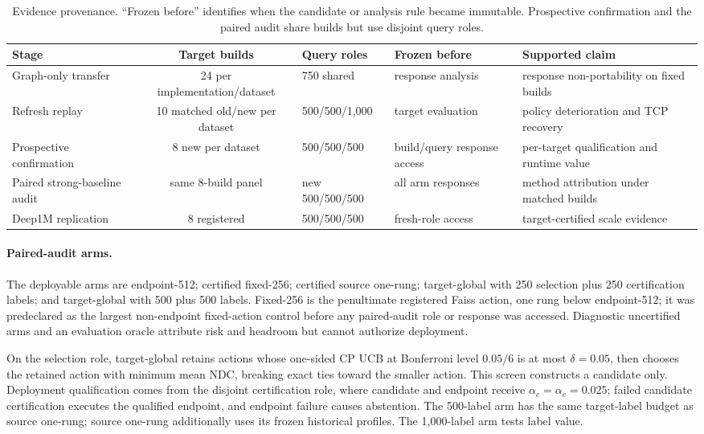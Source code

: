 \begin{table}[t]
\caption{Evidence provenance. ``Frozen before'' identifies when the candidate or analysis rule became immutable. Prospective confirmation and the paired audit share builds but use disjoint query roles.}
\label{tab:provenance}
\scriptsize
\begin{tabularx}{\textwidth}{@{}lcllX@{}}\toprule
Stage & Target builds & Query roles & Frozen before & Supported claim \\\midrule
Graph-only transfer & 24 per implementation/dataset & 750 shared & response analysis & response non-portability on fixed builds \\
Refresh replay & 10 matched old/new per dataset & 500/500/1,000 & target evaluation & policy deterioration and TCP recovery \\
Prospective confirmation & 8 new per dataset & 500/500/500 & build/query response access & per-target qualification and runtime value \\
Paired strong-baseline audit & same 8-build panel & new 500/500/500 & all arm responses & method attribution under matched builds \\
Deep1M replication & 8 registered & 500/500/500 & fresh-role access & target-certified scale evidence \\\bottomrule
\end{tabularx}
\end{table}

\paragraph{Paired-audit arms.}
The deployable arms are endpoint-512; certified fixed-256; certified source one-rung; target-global with 250 selection plus 250 certification labels; and target-global with 500 plus 500 labels. Fixed-256 is the penultimate registered Faiss action, one rung below endpoint-512; it was predeclared as the largest non-endpoint fixed-action control before any paired-audit role or response was accessed. Diagnostic uncertified arms and an evaluation oracle attribute risk and headroom but cannot authorize deployment.

On the selection role, target-global retains actions whose one-sided CP UCB at Bonferroni level $0.05/6$ is at most $\delta=0.05$, then chooses the retained action with minimum mean NDC, breaking exact ties toward the smaller action. This screen constructs a candidate only. Deployment qualification comes from the disjoint certification role, where candidate and endpoint receive $\alpha_c=\alpha_e=0.025$; failed candidate certification executes the qualified endpoint, and endpoint failure causes abstention. The 500-label arm has the same target-label budget as source one-rung; source one-rung additionally uses its frozen historical profiles. The 1,000-label arm tests label value.

